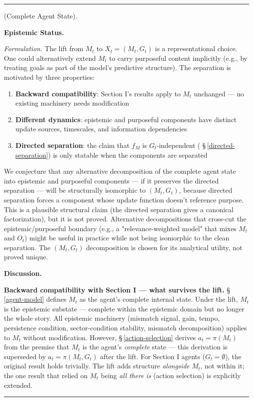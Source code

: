 \documentclass[11pt,oneside]{article}
\newcounter{claim}[section]
\renewcommand{\theclaim}{\thesection.\arabic{claim}}
\newenvironment{segment}[2]{%
  \refstepcounter{claim}%
  \bigskip\noindent\hrule\smallskip
  \noindent{\bfseries #1~\theclaim}\enskip(#2).\par\smallskip
  \noindent\ignorespaces
}{%
  \par\smallskip\noindent\hrule\bigskip
}
\newenvironment{formulation}[1][]{\begin{segment}{Formulation}{#1}}{\end{segment}}
\begin{document}
\begin{formulation}[Complete Agent State]
\medskip\noindent\textbf{Epistemic Status.}


\textit{Formulation.} The lift from $M_t$ to $X_t = (M_t, G_t)$ is a representational choice. One could alternatively extend $M_t$ to carry purposeful content implicitly (e.g., by treating goals as part of the model's predictive structure). The separation is motivated by three properties:

\begin{enumerate}
  \item \textbf{Backward compatibility}: Section I's results apply to $M_t$ unchanged — no existing machinery needs modification
  \item \textbf{Different dynamics}: epistemic and purposeful components have distinct update sources, timescales, and information dependencies
  \item \textbf{Directed separation}: the claim that $f_M$ is $G_t$-independent ( \S\,\ref{directed-separation}) is only statable when the components are separated
\end{enumerate}


We conjecture that any alternative decomposition of the complete agent state into epistemic and purposeful components — if it preserves the directed separation — will be structurally isomorphic to $(M_t, G_t)$, because directed separation forces a component whose update function doesn't reference purpose. This is a plausible structural claim (the directed separation gives a canonical factorization), but it is not proved. Alternative decompositions that cross-cut the epistemic/purposeful boundary (e.g., a "relevance-weighted model" that mixes $M_t$ and $O_t$) might be useful in practice while not being isomorphic to the clean separation. The $(M_t, G_t)$ decomposition is chosen for its analytical utility, not proved unique.


\medskip\noindent\textbf{Discussion.}


\textbf{Backward compatibility with Section I — what survives the lift.} \S\,\ref{agent-model} defines $M_t$ as the agent's complete internal state. Under the lift, $M_t$ is the epistemic substate — complete within the epistemic domain but no longer the whole story. All epistemic machinery (mismatch signal, gain, tempo, persistence condition, sector-condition stability, mismatch decomposition) applies to $M_t$ without modification. However, \S\,\ref{action-selection} derives $a_t = \pi(M_t)$ from the premise that $M_t$ is the agent's \textit{complete} state — this derivation is superseded by $a_t = \pi(M_t, G_t)$ after the lift. For Section I agents ($G_t = \emptyset$), the original result holds trivially. The lift adds structure \textit{alongside} $M_t$, not within it; the one result that relied on $M_t$ being \textit{all there is} (action selection) is explicitly extended.


\end{formulation}
\end{document}
